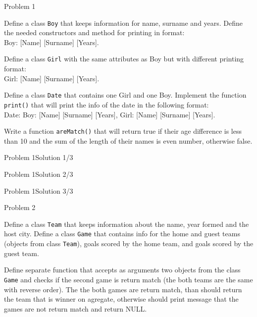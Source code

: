 
\begin{frame}{Problem 1}
\begin{scriptsize}
Define a class \texttt{Boy} that keeps information for name, surname and years.
Define the needed constructors and method for printing in format:
\\Boy: [Name] [Surname] [Years].

Define a class \texttt{Girl} with the same attributes as Boy but with different
printing format:
\\Girl: [Name] [Surname] [Years].

Define a class \texttt{Date} that contains one Girl and one Boy. Implement the
function \texttt{print()} that will print the info of the date in the following
format:
\\Date: Boy: [Name] [Surname] [Years], Girl: [Name] [Surname] [Years].

Write a function \texttt{areMatch()} that will return true if their age
difference is less than 10 and the sum of the length of their names is even
number, otherwise false.
\end{scriptsize}
\end{frame}

\begin{frame}[fragile]{Problem 1}{Solution 1/3}

\end{frame}

\begin{frame}[fragile]{Problem 1}{Solution 2/3}

\end{frame}

\begin{frame}[fragile]{Problem 1}{Solution 3/3}

\end{frame}


\begin{frame}{Problem 2}
\begin{scriptsize}
Define a class \texttt{Team} that keeps information about the name, year formed
and the host city. Define a class \texttt{Game} that contains info for the home
and guest teams (objects from class \texttt{Team}), goals scored by the home
team, and goals scored by the guest team.

Define separate function that accepts as arguments two objects from the class
\texttt{Game} and checks if the second game is return match (the both teams are
the same with reverse order). The the both games are return match, than should
return the team that is winner on agregate, otherwise should print message that
the games are not return match and return NULL.

\end{scriptsize}
\end{frame}

